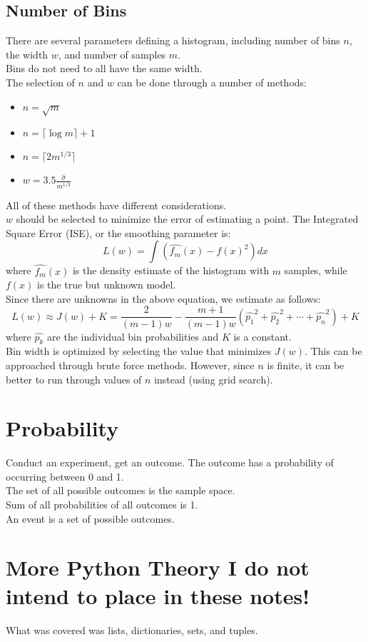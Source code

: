 \documentclass[nobib]{tufte-handout}
\begin{document}
\subsection{Number of Bins}
There are several parameters defining a histogram, including number of bins
$n$, the width $w$, and number of samples $m$.\\ Bins do not need to all have
the same width.\\ The selection of $n$ and $w$ can be done through a number of
methods:
\begin{itemize}
    \item $n = \sqrt{m}$
    \item $n = \lceil \log m \rceil + 1$
    \item $n = \lceil 2m^{1/3} \rceil$
    \item $w = 3.5 \frac{\hat{\sigma}}{m^{1/3}}$
\end{itemize}
All of these methods have different considerations.\\
$w$ should be selected to minimize the error of estimating a point.
The Integrated Square Error (ISE), or the smoothing parameter is:
\begin{equation*}
    L(w) = \int (\hat{f_m}(x)-f(x)^2)dx
\end{equation*}
where $\hat{f_m}(x)$ is the density estimate of the histogram with $m$ samples, while $f(x)$ is the true but unknown model.\\
Since there are unknowns in the above equation, we estimate as follows:
\begin{equation*}
    L(w)\approx J(w) + K = \frac{2}{(m-1)w}-\frac{m+1}{(m-1)w}(\hat{p_1}^2+\hat{p_2}^2+\cdots+\hat{p_n}^2) +K
\end{equation*}
where $\hat{p_k}$ are the individual bin probabilities and $K$ is a constant. \\
Bin width is optimized by selecting the value that minimizes $J(w)$. This can be approached through brute force methods. However, since $n$ is finite, it can be better to run through values of $n$ instead (using grid search).
\section{Probability}
Conduct an experiment, get an outcome.
The outcome has a probability of occurring between 0 and 1.\\
The set of all possible outcomes is the sample space.\\
Sum of all probabilities of all outcomes is 1.\\
An event is a set of possible outcomes.\\
\section*{More Python Theory I do not intend to place in these notes!}
What was covered was lists, dictionaries, sets, and tuples.
\end{document}
